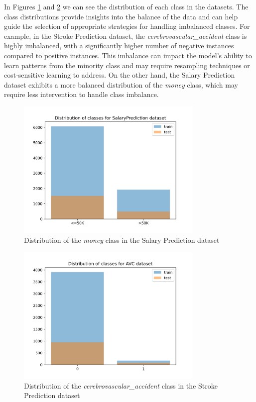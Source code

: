 \documentclass[runningheads]{paper}
\begin{document}
In Figures \ref{fig:distribution_salary} and \ref{fig:distribution_stroke} we can
see the distribution of each class in the datasets. The class distributions provide
insights into the balance of the data and can help guide the selection of appropriate
strategies for handling imbalanced classes. For example, in the Stroke Prediction
dataset, the \textit{cerebrovascular\_accident} class is highly imbalanced, with
a significantly higher number of negative instances compared to positive instances.
This imbalance can impact the model's ability to learn patterns from the minority
class and may require resampling techniques or cost-sensitive learning to address.
On the other hand, the Salary Prediction dataset exhibits a more balanced distribution
of the \textit{money} class, which may require less intervention to handle class
imbalance.

\begin{figure}[H]
    \centering
    \includegraphics[width=0.8\textwidth]{../plots/distribution_SalaryPrediction.png}
    \caption{Distribution of the \textit{money} class in the Salary Prediction dataset}
    \label{fig:distribution_salary}
\end{figure}

\begin{figure}[H]
    \centering
    \includegraphics[width=0.8\textwidth]{../plots/distribution_AVC.png}
    \caption{Distribution of the \textit{cerebrovascular\_accident} class in the Stroke Prediction dataset}
    \label{fig:distribution_stroke}
\end{figure}
\end{document}

